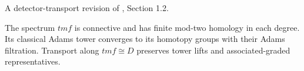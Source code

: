 \begin{proposition}
\label{sem:Literature:tmf-convergence}
A detector-transport revision of \cite{BR21}, Section 1.2.\par

The spectrum $\mathit{tmf}$ is connective and has finite mod-two homology in each degree. Its classical Adams tower converges to its homotopy groups with their Adams filtration. Transport along $\mathit{tmf}\cong D$ preserves tower lifts and associated-graded representatives.
\end{proposition}

